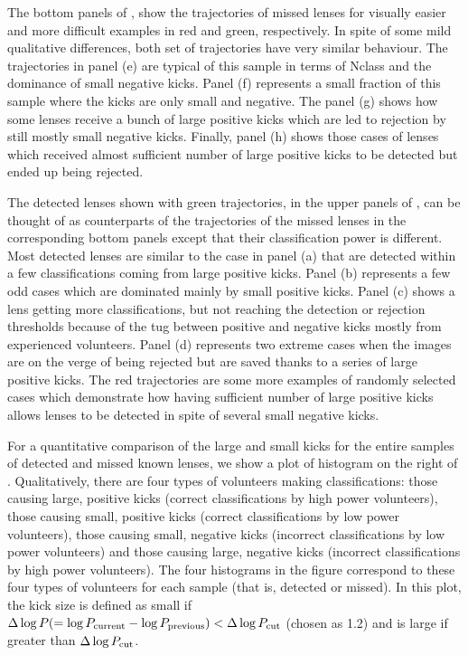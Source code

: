 \documentclass[useAMS,usenatbib,a4paper]{mn2e}
\begin{document}
The bottom panels of , show the trajectories of missed
lenses for visually easier and more difficult examples in red and green,
respectively.  In spite of some mild qualitative differences, both set
of trajectories have very similar behaviour. The trajectories in panel
(e) are typical of this sample in terms of Nclass and the dominance of
small negative kicks. Panel (f) represents a small fraction of this
sample where the kicks are only small and negative. The panel (g) shows
how some lenses receive a bunch of large positive kicks which are led to
rejection by still mostly small negative kicks. Finally, panel (h) shows
those cases of lenses which received almost sufficient number of large
positive kicks to be detected but ended up being rejected.

The detected lenses shown with green trajectories, in the upper
panels of , can be thought of as counterparts of the trajectories of the
missed lenses in the corresponding bottom panels except that their
classification power is different. Most detected lenses are similar to the case
in panel (a) that are detected within a few classifications coming from
large positive kicks.  Panel (b) represents a few odd cases which are
dominated mainly by small positive kicks. Panel (c) shows a lens getting
more classifications, but not reaching the detection or rejection
thresholds because of the tug between positive and negative kicks mostly
from experienced volunteers.  Panel (d) represents two extreme cases when
the images are on the verge of being rejected but are saved thanks to a
series of large positive kicks.  The red trajectories are some more
examples of randomly selected cases which demonstrate how having
sufficient number of large positive kicks allows lenses to be detected
in spite of several small negative kicks.

For a quantitative comparison of the large and small kicks for the
entire samples of detected and missed known lenses, we show a plot of
histogram on the right of . Qualitatively, there are
four types of volunteers making classifications: those causing large, positive
kicks (correct classifications by high power volunteers), those
causing small, positive kicks (correct classifications by low power
volunteers), those causing small, negative kicks (incorrect
classifications by low power volunteers) and those causing large, negative
kicks (incorrect classifications by high power volunteers). The
four histograms in the figure correspond to these four types of
volunteers for each sample (that is, detected or missed). In this plot,
the kick size
is defined as small if
$\Delta \log{P} (= \log{P_{\rm current}} - \log{P_{\rm
previous}}) < \Delta\log{P}_{\rm cut}$ (chosen as 1.2) and is large
if greater than $\Delta\log{P}_{\rm cut}$.
\end{document}

